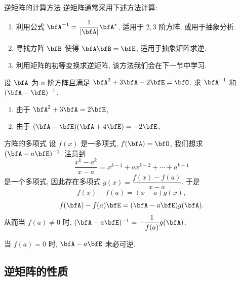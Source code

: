 \begin{frame}{逆矩阵的计算方法}
	\onslide<+->
	逆矩阵通常采用下述方法计算:
	\begin{enumerate}
		\item 利用公式 $\bfA^{-1}=\dfrac1{|\bfA|}\bfA^*$, 适用于 $2,3$ 阶方阵, 或用于抽象分析.
		\item 寻找方阵 $\bfB$ 使得 $\bfA\bfB=\bfE$, 适用于抽象矩阵求逆.
		\item 利用矩阵的初等变换求逆矩阵, 该方法我们会在下一节中学习.
	\end{enumerate}
	\onslide<+->
	\begin{example}
		设 $\bfA$ 为 $n$ 阶方阵且满足 $\bfA^2+3\bfA-2\bfE=\bfO$.
		求 $\bfA^{-1}$ 和 $(\bfA-\bfE)^{-1}$.
	\end{example}
	\onslide<+->
	\begin{solution}
		\begin{enumerate}
			\item 由于 $\bfA^2+3\bfA=2\bfE$, 
			\onslide<+->{%
			因此 $\bfA(\bfA+3\bfE)=2\bfE, \bfA^{-1}=\dfrac12(\bfA+3\bfE)$.}
			\item 由于 $(\bfA-\bfE)(\bfA+4\bfE)=-2\bfE$,
			\onslide<+->{%
			因此 $(\bfA-\bfE)^{-1}=-\dfrac12(\bfA+4\bfE)$.}
		\end{enumerate}
	\end{solution}
\end{frame}


\begin{frame}{方阵的多项式}
	\onslide<+->
	设 $f(x)$ 是一多项式, $f(\bfA)=\bfO$, 我们想求 $(\bfA-a\bfE)^{-1}$.
	\onslide<+->
	注意到
	\[\frac{x^k-a^k}{x-a}=x^{k-1}+ax^{k-2}+\cdots+a^{k-1}\]
	是一个多项式, 因此存在多项式 $g(x)=\dfrac{f(x)-f(a)}{x-a}$.
	\onslide<+->
	于是
	\[f(x)-f(a)=(x-a)g(x),\]
	\[f(\bfA)-f(a)\bfE=(\bfA-a\bfE)g(\bfA).\]
	\onslide<+->
	从而当 $f(a)\neq 0$ 时, $(\bfA-a\bfE)^{-1}=-\dfrac1{f(a)}g(\bfA)$.

	\onslide<+->
	当 $f(a)=0$ 时, $\bfA-a\bfE$ 未必可逆.
	
\end{frame}


\subsection{逆矩阵的性质}

